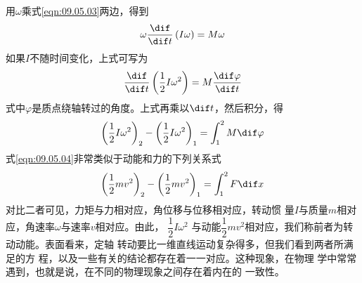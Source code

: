 \documentclass[../outline-of-mechanics.tex]{subfiles}
\begin{document}
用$ \omega $乘式\eqref{eqn:09.05.03}两边，得到
\begin{equation*}
  \omega \frac { \dif } { \dif t } \left( I \omega \right) = M \omega
\end{equation*}
如果$ I $不随时间变化，上式可写为
\begin{equation*}
  \frac { \dif } { \dif t } \left( \frac { 1 } { 2 } I \omega ^ { 2 } \right) = M \frac { \dif \varphi } { \dif t }
\end{equation*}
式中$ \varphi $是质点绕轴转过的角度。上式再乘以$ \dif t $，然后积分，得
\begin{equation}\label{eqn:09.05.04}
  { \left( \frac { 1 } { 2 } I \omega ^ { 2 } \right) } _ { 2 } - { \left( \frac { 1 } { 2 } I \omega ^ { 2 } \right) } _ { 1 } = \int _ 1 ^ { 2 } M \dif \varphi
\end{equation}
式\eqref{eqn:09.05.04}非常类似于动能和力的下列关系式
\begin{equation*}
  { \left( \frac { 1 } { 2 } m v ^ { 2 } \right) } _ { 2 } - { \left( \frac { 1 } { 2 } m v ^ { 2 } \right) } _ { 1 } = \int _ { 1 } ^ { 2 } F \dif x
\end{equation*}
对比二者可见，力矩与力相对应，角位移与位移相对应，转动惯
量$ I $与质量$ m $相对应，角速率$ \omega $与速率$ v $相对应。由此，
$ \dfrac { 1 } { 2 } I \omega ^ { 2 } $
与动能$ \dfrac { 1 } { 2 } m v ^ { 2 } $相对应，我们称前者为转动动能。表面看来，定轴
转动要比一维直线运动复杂得多，但我们看到两者所满足的方
程，以及一些有关的结论都存在着一一对应。这种现象，在物理
学中常常遇到，也就是说，在不同的物理现象之间存在着内在的
一致性。
\end{document}
